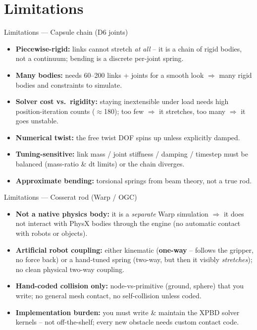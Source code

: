 \documentclass[aspectratio=169]{beamer}
\begin{document}
\section{Limitations}

\begin{frame}{Limitations --- Capsule chain (D6 joints)}
  \footnotesize
  \begin{itemize}\itemsep2pt
    \item \textbf{Piecewise-rigid:} links cannot stretch \emph{at all} -- it is a chain
          of rigid bodies, not a continuum; bending is a discrete per-joint spring.
    \item \textbf{Many bodies:} needs 60--200 links + joints for a smooth look
          $\Rightarrow$ many rigid bodies and constraints to simulate.
    \item \textbf{Solver cost vs.\ rigidity:} staying inextensible under load needs
          high position-iteration counts ($\approx$180); too few $\Rightarrow$ it
          stretches, too many $\Rightarrow$ it goes unstable.
    \item \textbf{Numerical twist:} the free twist DOF spins up unless explicitly damped.
    \item \textbf{Tuning-sensitive:} link mass / joint stiffness / damping / timestep
          must be balanced (mass-ratio \& dt limits) or the chain diverges.
    \item \textbf{Approximate bending:} torsional springs from beam theory, not a true rod.
  \end{itemize}
\end{frame}

\begin{frame}{Limitations --- Cosserat rod (Warp / OGC)}
  \footnotesize
  \begin{itemize}\itemsep2pt
    \item \textbf{Not a native physics body:} it is a \emph{separate} Warp simulation
          $\Rightarrow$ it does not interact with PhysX bodies through the engine
          (no automatic contact with robots or objects).
    \item \textbf{Artificial robot coupling:} either kinematic (\textbf{one-way} --
          follows the gripper, no force back) or a hand-tuned spring (two-way, but then
          it visibly \emph{stretches}); no clean physical two-way coupling.
    \item \textbf{Hand-coded collision only:} node-vs-primitive (ground, sphere) that
          you write; no general mesh contact, no self-collision unless coded.
    \item \textbf{Implementation burden:} you must write \& maintain the XPBD solver
          kernels -- not off-the-shelf; every new obstacle needs custom contact code.
  \end{itemize}
\end{frame}
\end{document}
